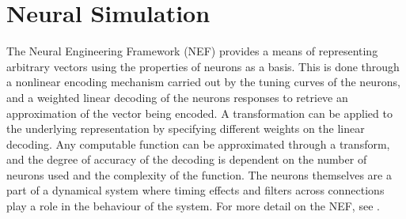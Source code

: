 \documentclass[letterpaper,12pt,titlepage,oneside,final]{book}
\begin{document}
\section{Neural Simulation}




The Neural Engineering Framework (NEF)\cite{eliasmith2004neural} provides a means of representing arbitrary vectors using the properties of neurons as a basis.
This is done through a nonlinear encoding mechanism carried out by the tuning curves of the neurons, and a weighted linear decoding of the neurons responses to retrieve an approximation of the vector being encoded.
A transformation can be applied to the underlying representation by specifying different weights on the linear decoding.
Any computable function can be approximated through a transform, and the degree of accuracy of the decoding is dependent on the number of neurons used and the complexity of the function.
The neurons themselves are a part of a dynamical system where timing effects and filters across connections play a role in the behaviour of the system. 
For more detail on the NEF, see \cite{eliasmith2007build, stewart2011neural, eliasmith2013build}. %
\end{document}
